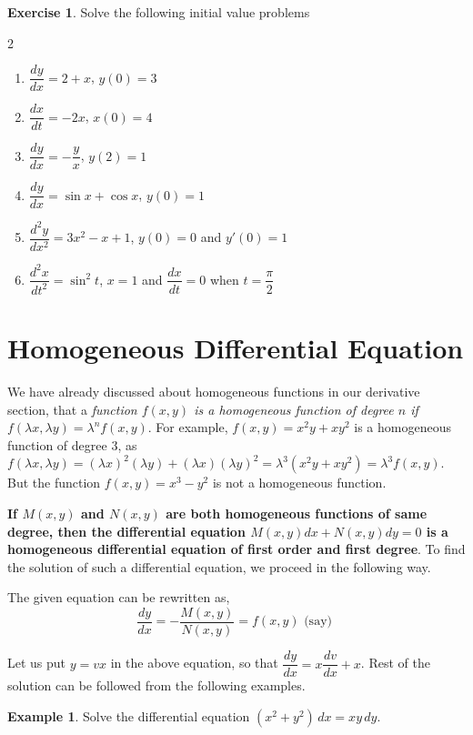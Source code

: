 \documentclass{book}
\theoremstyle{definition}
\newtheorem{exercise}{Exercise}[section]
\newtheorem{example}{Example}[section]
\begin{document}
\begin{exercise}
Solve the following initial value problems
\begin{multicols}{2}
\begin{enumerate}[label=(\roman*)]
    \item $\dfrac{dy}{dx}=2+x$, $y(0)=3$
    \item $\dfrac{dx}{dt}=-2x$, $x(0)=4$
    \item $\dfrac{dy}{dx}=-\dfrac{y}{x}$, $y(2)=1$
    \item $\dfrac{dy}{dx}=\sin x+\cos x$, $y(0)=1$
    \item $\dfrac{d^2y}{dx^2}=3x^2-x+1$, $y(0)=0$ and $y'(0)=1$
    \item $\dfrac{d^2x}{dt^2}=\sin^2 t$, $x=1$ and $\dfrac{dx}{dt}=0$ when $t=\dfrac{\pi}{2}$

\end{enumerate}
\end{multicols}
\end{exercise}

\section{Homogeneous Differential Equation}

We have already discussed about homogeneous functions in our derivative section, that a \textit{function $f(x,y)$ is a homogeneous function of degree $n$ if $f(\lambda x,\lambda y)=\lambda^n f(x,y)$}. For example, $f(x,y)=x^2y+xy^2$ is a homogeneous function of degree 3, as $f(\lambda x,\lambda y)=(\lambda x)^2(\lambda y)+(\lambda x)(\lambda y)^2=\lambda^3(x^2y+xy^2)=\lambda^3 f(x,y)$. But the function $f(x,y)=x^3-y^2$ is not a homogeneous function.

\textbf{If $M(x,y)$ and $N(x,y)$ are both homogeneous functions of same degree, then the differential equation $M(x,y)dx+N(x,y)dy=0$ is a homogeneous differential equation of first order and first degree}. To find the solution of such a differential equation, we proceed in the following way.

The given equation can be rewritten as,
\[
\frac{dy}{dx}=-\frac{M(x,y)}{N(x,y)}=f(x,y) \text{ (say) }
\]


Let us put $y=vx$ in the above equation, so that $\dfrac{dy}{dx}=x\dfrac{dv}{dx}+x$. Rest of the solution can be followed from the following examples.

\begin{example}
Solve the differential equation $(x^2+y^2)\,dx=xy\,dy$.
\end{example}
\end{document}
